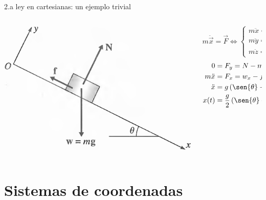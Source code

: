 \documentclass[serif]{beamer}
\begin{document}
\begin{frame}
\begin{block}{2.a ley en cartesianas: un ejemplo trivial}
\begin{columns}[c]
	\begin{column}{0.35\textwidth}
		\includegraphics[width=\textwidth]{taylor1_9}
	\end{column}
  \begin{column}{0.65\textwidth}
		\[
		m \ddot{\vec{x}} = \vec{F} \iff
		\begin{cases}
			m \ddot{x} = F_x\\
			m \ddot{y} = F_y\\
			m \ddot{z} = F_z
		\end{cases}
		\]
		\pause
		\begin{align*}
			0 &= F_y = N - m g \cos{\theta}\\
			m \ddot{x} &= F_x = w_x- f = m g \sen{\theta} - \mu m g \cos{\theta}\\
			\ddot{x} &= g \left(\sen{\theta} - \mu \cos{\theta}\right)\\
			x(t) &= \frac{g}{2} \left(\sen{\theta} - \mu \cos{\theta}\right) t^2 \, [\dot{x}(0)=0, x(0)=0]
		\end{align*}
	\end{column}
\end{columns}
\end{block}
\end{frame}


\section{Sistemas de coordenadas}
\end{document}
